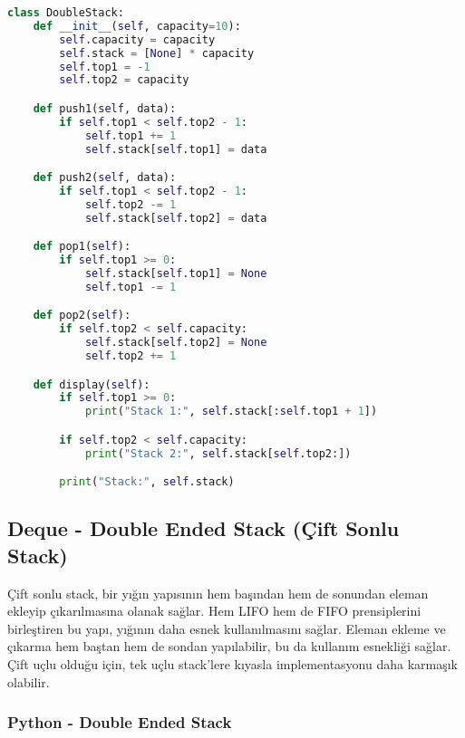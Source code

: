 \begin{lstlisting}[language=Python]
class DoubleStack:
    def __init__(self, capacity=10):
        self.capacity = capacity
        self.stack = [None] * capacity
        self.top1 = -1
        self.top2 = capacity

    def push1(self, data):
        if self.top1 < self.top2 - 1:
            self.top1 += 1
            self.stack[self.top1] = data

    def push2(self, data):
        if self.top1 < self.top2 - 1:
            self.top2 -= 1
            self.stack[self.top2] = data

    def pop1(self):
        if self.top1 >= 0:
            self.stack[self.top1] = None
            self.top1 -= 1

    def pop2(self):
        if self.top2 < self.capacity:
            self.stack[self.top2] = None
            self.top2 += 1

    def display(self):
        if self.top1 >= 0:
            print("Stack 1:", self.stack[:self.top1 + 1])

        if self.top2 < self.capacity:
            print("Stack 2:", self.stack[self.top2:])

        print("Stack:", self.stack)
\end{lstlisting}

\newpage

\subsection{Deque - Double Ended Stack (Çift Sonlu Stack)}

Çift sonlu stack, bir yığın yapısının hem başından hem de sonundan eleman ekleyip çıkarılmasına olanak sağlar. Hem LIFO hem de FIFO prensiplerini birleştiren bu yapı, yığının daha esnek kullanılmasını sağlar. Eleman ekleme ve çıkarma hem baştan hem de sondan yapılabilir, bu da kullanım esnekliği sağlar. Çift uçlu olduğu için, tek uçlu stack’lere kıyasla implementasyonu daha karmaşık olabilir.

\subsubsection{Python - Double Ended Stack}


